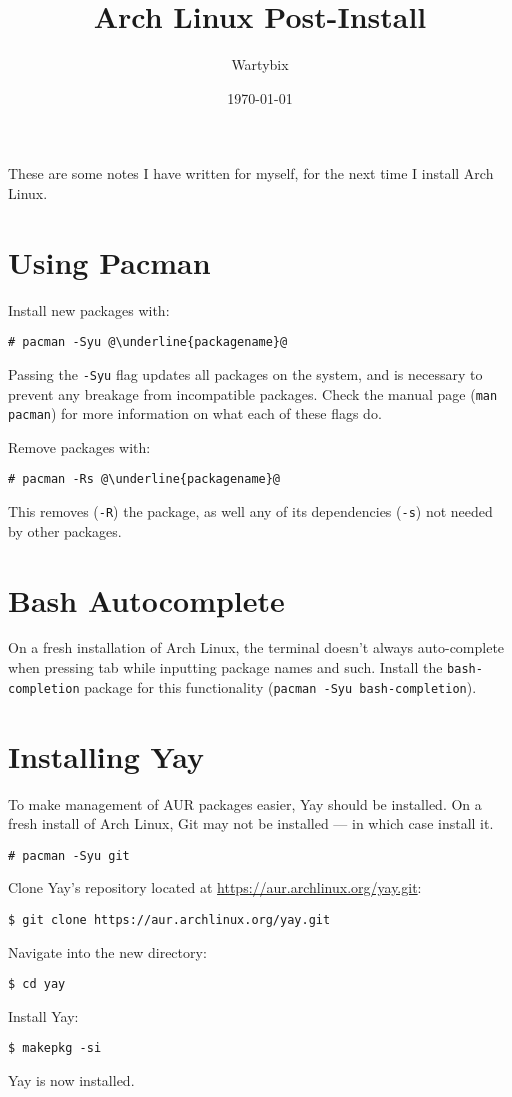 \documentclass[a4paper]{article}
\title{Arch Linux Post-Install}
\author{Wartybix}
\date{\today}
\begin{document}
\maketitle

These are some notes I have written for myself, for the next time I install Arch Linux.

\section{Using Pacman}

Install new packages with:
\begin{lstlisting}[escapechar=@]
# pacman -Syu @\underline{packagename}@
\end{lstlisting}
Passing the \lstinline|-Syu| flag updates all packages on the system, and is necessary to prevent any breakage from incompatible packages.
Check the manual page (\lstinline|man pacman|) for more information on what each of these 
flags do.

Remove packages with:
\begin{lstlisting}[escapechar=@]
# pacman -Rs @\underline{packagename}@
\end{lstlisting}
This removes (\lstinline|-R|) the package, as well any of its dependencies (\lstinline|-s|) not needed by other packages.

\section{Bash Autocomplete}

On a fresh installation of Arch Linux, the terminal doesn't always auto-complete when pressing tab while inputting package names and such.
Install the \lstinline|bash-completion| package for this functionality (\lstinline|pacman -Syu bash-completion|).

\section{Installing Yay}

To make management of AUR packages easier, Yay should be installed.
On a fresh install of Arch Linux, Git may not be installed --- in which case install it.
\begin{lstlisting}
# pacman -Syu git
\end{lstlisting}
Clone Yay's repository located at \url{https://aur.archlinux.org/yay.git}:
\begin{lstlisting}
$ git clone https://aur.archlinux.org/yay.git
\end{lstlisting}
Navigate into the new directory:
\begin{lstlisting}
$ cd yay
\end{lstlisting}
Install Yay:
\begin{lstlisting}
$ makepkg -si
\end{lstlisting}
Yay is now installed.
\end{document}
